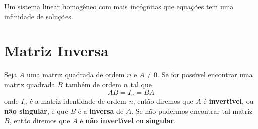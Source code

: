 \begin{teorema}
    Um sistema linear homog\^eneo com mais inc\'ognitas que equa\c{c}\~oes tem uma infinidade de solu\c{c}\~oes.
\end{teorema}

\section{Matriz Inversa}

\begin{definicao}
    Seja $A$ uma matriz quadrada de ordem $n$ e $A \ne 0$. Se for poss{\'\i}vel encontrar uma matriz quadrada $B$ tamb\'em de 
    ordem $n$ tal que
    \[
        AB = I_n = BA   
    \]
    onde $I_n$ \'e a matriz identidade de ordem $n$, ent\~ao diremos que $A$ \'e \textbf{invert{\'\i}vel}, ou \textbf{n\~ao singular},
    e que $B$ \'e a \textbf{inversa} de $A$. Se n\~ao pudermos encontrar tal matriz $B$, ent\~ao diremos que $A$ \'e \textbf{n\~ao invert{\'\i}vel}  
    ou \textbf{singular}.
\end{definicao}

